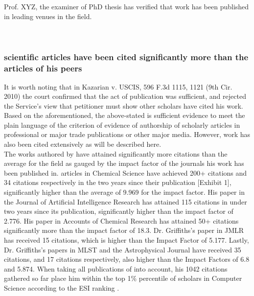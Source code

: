 \documentclass[11pt]{article}
\begin{document}
Prof. XYZ, the examiner of \drs PhD thesis has verified that \drs work has been published in leading venues in the field.\\

\\\\ \pl

\subsubsection{\drs scientific articles have been cited significantly more than the articles of his peers}
\label{articlespeers}

It is worth noting that in Kazarian v. USCIS, 596 F.3d 1115, 1121 (9th Cir. 2010) the court confirmed that the act of publication was sufficient, and rejected the Service’s view that petitioner must show other scholars have cited his work. Based on the aforementioned, the above-stated is sufficient evidence to meet the plain language of the criterion of evidence of authorship of scholarly articles in professional or major trade
publications or other major media. However, \drs work has also been cited extensively as will be described here. \\

The works authored by \dr have attained significantly more citations than the average for the field as gauged by the impact factor of the journals his work has been published in. \drs articles in Chemical Science have achieved 200+ citations and 34 citations respectively in the two years since their publication [Exhibit 1], significantly higher than the average of 9.969 for the impact factor. His paper in the Journal of Artificial Intelligence Research has attained 115 citations in under two years since its publication, significantly higher than the impact factor of 2.776. His paper in Accounts of Chemical Research has attained 50+ citations significantly more than the impact factor of 18.3. Dr. Griffiths’s paper in JMLR has received 15 citations, which is higher than the Impact Factor of 5.177. Lastly, Dr. Griffiths’s papers in MLST and the Astrophysical Journal have received 35 citations, and 17 citations respectively, also higher than the Impact Factors of 6.8 and 5.874. When taking all publications of \dr into account, his 1042 citations gathered so far place him within the top 1\% percentile of scholars in Computer Science according to the ESI ranking \cite{esi}.
\end{document}
